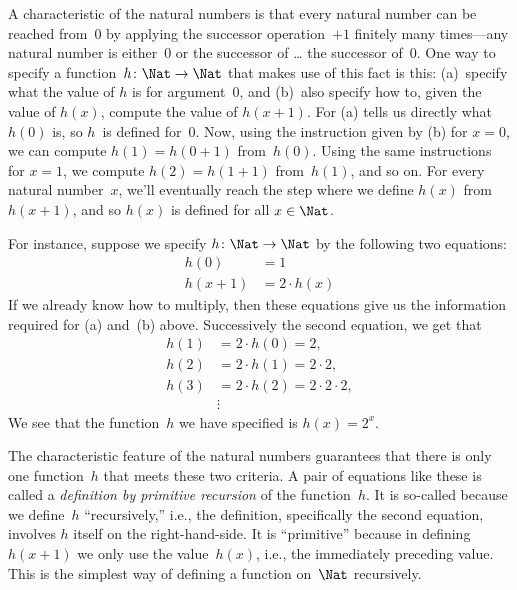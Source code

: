 \documentclass[../../../include/open-logic-section]{subfiles}
\begin{document}

A characteristic of the natural numbers is that every natural number
can be reached from~$0$ by applying the successor operation~$+1$
finitely many times---any natural number is either~$0$ or the
successor of \dots{} the successor of~$0$. One way to specify a
function~$h\colon\Nat \to \Nat$ that makes use of this fact is this:
(a)~specify what the value of $h$ is for argument~$0$, and (b)~also
specify how to, given the value of $h(x)$, compute the value of
$h(x+1)$. For (a) tells us directly what $h(0)$ is, so $h$~is defined
for~$0$. Now, using the instruction given by (b) for $x=0$, we can
compute $h(1) = h(0+1)$ from~$h(0)$. Using the same instructions for
$x=1$, we compute $h(2) = h(1+1)$ from~$h(1)$, and so on. For every
natural number~$x$, we'll eventually reach the step where we define
$h(x)$ from $h(x+1)$, and so $h(x)$ is defined for all $x \in \Nat$.

For instance, suppose we specify $h\colon \Nat \to \Nat$ by the following
two equations:
\begin{align*}
h(0) & =  1\\
h(x+1) & =  2 \cdot h(x)
\end{align*}
If we already know how to multiply, then these equations give us the
information required for (a) and~(b) above. Successively the second
equation, we get that
\begin{align*}
  h(1) & = 2\cdot h(0) = 2,\\
  h(2) & = 2\cdot h(1) = 2\cdot 2,\\
  h(3) & = 2 \cdot h(2) = 2\cdot 2 \cdot 2,\\
  & \vdots
\end{align*}
We see that the function~$h$ we have specified is $h(x) = 2^x$.

The characteristic feature of the natural numbers guarantees that
there is only one function~$h$ that meets these two criteria.  A pair
of equations like these is called a \emph{definition by primitive
recursion} of the function~$h$. It is so-called because we define~$h$
``recursively,'' i.e., the definition, specifically the second
equation, involves $h$ itself on the right-hand-side. It is
``primitive'' because in defining $h(x+1)$ we only use the
value~$h(x)$, i.e., the immediately preceding value. This is the
simplest way of defining a function on~$\Nat$ recursively.
\end{document}
